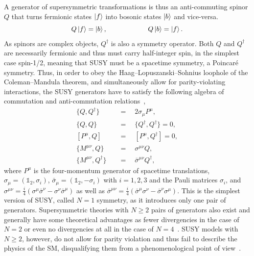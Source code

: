 A generator of supersymmetric transformations is thus an anti-commuting spinor $Q$ that turns fermionic states $\ket{f}$ into bosonic states $\ket{b}$ and vice-versa.
\begin{equation}
	Q\ket{f} = \ket{b}, \qquad \qquad \qquad Q\ket{b}=\ket{f}.
\end{equation}
As spinors are complex objects, $Q^\dagger$ is also a symmetry operator. Both $Q$ and $Q^\dagger$ are necessarily fermionic and thus must carry half-integer spin, in the simplest case spin-1/2, meaning that SUSY must be a spacetime symmetry, \ie a Poincaré symmetry. 
Thus, in order to obey the Haag--Lopuszanski--Sohnius loophole of the Coleman--Mandula theorem, and simultaneously allow for parity-violating interactions, the SUSY generators have to satisfy the following algebra of commutation and anti-commutation relations~\cite{Bustamante:2009us},
\begin{equation}
\begin{split}
	\{ Q,Q^\dagger \} & \quad = \quad  2\sigma_\mu P^\mu,\\
	\{ Q,Q \} &  \quad = \quad \{ Q^\dagger,Q^\dagger \} = 0, \\
	\left[P^\mu,Q \right] &  \quad = \quad \left[ P^\mu,Q^\dagger \right] = 0, \\
	\{ M^{\mu\nu}, Q \} & \quad = \quad \sigma^{\mu\nu} Q,\\
	\{ M^{\mu\nu},Q^\dagger \} & \quad = \quad \bar{\sigma}^{\mu\nu} Q^\dagger,
  \label{eq:commute}
\end{split}
\end{equation}
where $P^\mu$ is the four-momentum generator of spacetime translations, $\sigma_\mu = (\mathbb{1}_2,\sigma_i)$, $\bar{\sigma}_\mu = (\mathbb{1}_2,-\sigma_i)$ with $i=1,2,3$ and the Pauli matrices $\sigma_i$, and $\sigma^{\mu\nu} = \frac{i}{4}(\sigma^\mu\bar{\sigma}^\nu - \sigma^\nu\bar{\sigma}^\mu)$ as well as $\bar{\sigma}^{\mu\nu} = \frac{i}{4}(\bar{\sigma}^\mu\sigma^\nu - \bar{\sigma}^\nu\sigma^\mu)$. This is the simplest version of SUSY, called $N=1$ symmetry, as it introduces only one pair of generators. Supersymmetric theories with $N\geq 2$ pairs of generators also exist and generally have some theoretical advantages as \eg fewer divergencies in the case of $N=2$ or even no divergencies at all in the case of $N=4$~\cite{Bustamante:2009us}. SUSY models with $N\geq 2$, however, do not allow for parity violation and thus fail to describe the physics of the SM, disqualifying them from a phenomenological point of view~\cite{Bustamante:2009us}.

